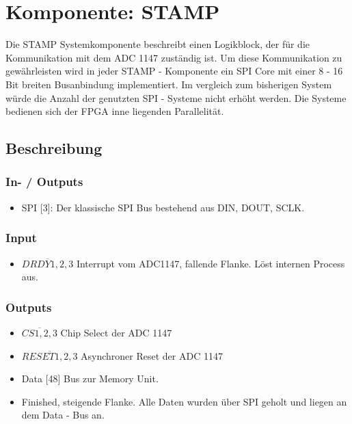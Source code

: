 \section{Komponente: STAMP}
Die STAMP Systemkomponente beschreibt einen Logikblock, der für die Kommunikation mit dem ADC 1147 zuständig ist. Um diese Kommunikation zu gewährleisten wird in jeder STAMP - Komponente ein SPI Core mit einer 8 - 16 Bit breiten  Busanbindung implementiert. Im vergleich zum bisherigen System würde die Anzahl der genutzten SPI - Systeme nicht erhöht werden. Die Systeme bedienen sich der FPGA inne liegenden Parallelität. 
\subsection{Beschreibung} 
\subsubsection{In- / Outputs}
\begin{itemize}
\item SPI [3]: Der klassische SPI Bus bestehend aus DIN, DOUT, SCLK.
\end{itemize}
\subsubsection{Input}
\begin{itemize}
\item $\overline{DRDY1,2,3}$ Interrupt vom ADC1147, fallende Flanke. Löst internen Process aus.  
\end{itemize}
\subsubsection{Outputs}
\begin{itemize}
\item $\overline{CS1,2,3} $ Chip Select der ADC 1147
\item $\overline{RESET1,2,3}$ Asynchroner Reset der ADC 1147
\item Data [48] Bus zur Memory Unit. 
\item Finished, steigende Flanke. Alle Daten wurden über SPI geholt und liegen an dem Data - Bus an. 
\end{itemize}
